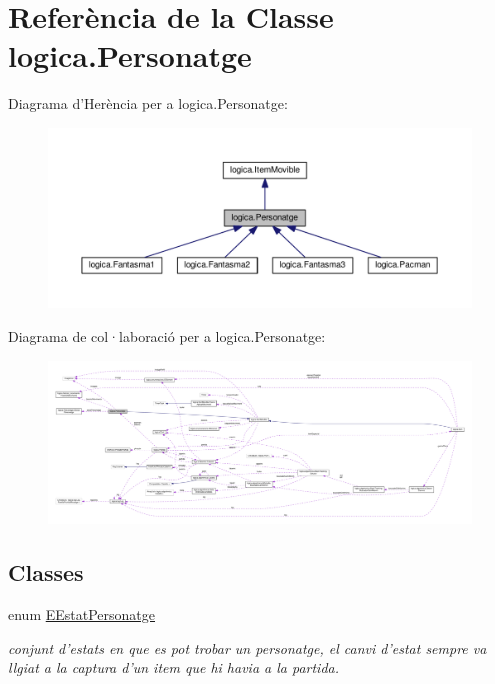 \hypertarget{classlogica_1_1_personatge}{\section{Referència de la Classe logica.\+Personatge}
\label{classlogica_1_1_personatge}
}


Diagrama d'Herència per a logica.\+Personatge\+:
\nopagebreak
\begin{figure}[H]
\begin{center}
\leavevmode
\includegraphics[width=350pt]{classlogica_1_1_personatge__inherit__graph}
\end{center}
\end{figure}


Diagrama de col·laboració per a logica.\+Personatge\+:
\nopagebreak
\begin{figure}[H]
\begin{center}
\leavevmode
\includegraphics[width=350pt]{classlogica_1_1_personatge__coll__graph}
\end{center}
\end{figure}
\subsection*{Classes}
\begin{DoxyCompactItemize}
\item 
enum \hyperlink{enumlogica_1_1_personatge_1_1_e_estat_personatge}{E\+Estat\+Personatge}
\begin{DoxyCompactList}\small\item\em conjunt d'estats en que es pot trobar un personatge, el canvi d'estat sempre va llgiat a la captura d'un item que hi havia a la partida. \end{DoxyCompactList}\end{DoxyCompactItemize}
